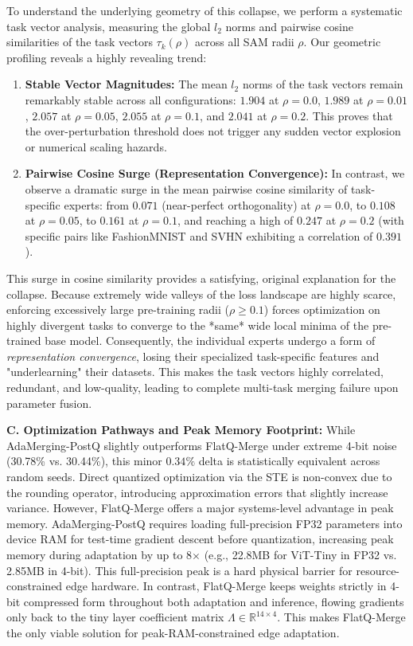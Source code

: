 To understand the underlying geometry of this collapse, we perform a systematic task vector analysis, measuring the global $l_2$ norms and pairwise cosine similarities of the task vectors $\tau_k(\rho)$ across all SAM radii $\rho$.
Our geometric profiling reveals a highly revealing trend:
\begin{enumerate}
    \item \textbf{Stable Vector Magnitudes:} The mean $l_2$ norms of the task vectors remain remarkably stable across all configurations: $1.904$ at $\rho=0.0$, $1.989$ at $\rho=0.01$, $2.057$ at $\rho=0.05$, $2.055$ at $\rho=0.1$, and $2.041$ at $\rho=0.2$. This proves that the over-perturbation threshold does not trigger any sudden vector explosion or numerical scaling hazards.
    \item \textbf{Pairwise Cosine Surge (Representation Convergence):} In contrast, we observe a dramatic surge in the mean pairwise cosine similarity of task-specific experts: from $0.071$ (near-perfect orthogonality) at $\rho=0.0$, to $0.108$ at $\rho=0.05$, to $0.161$ at $\rho=0.1$, and reaching a high of $0.247$ at $\rho=0.2$ (with specific pairs like FashionMNIST and SVHN exhibiting a correlation of $0.391$).
\end{enumerate}
This surge in cosine similarity provides a satisfying, original explanation for the collapse. Because extremely wide valleys of the loss landscape are highly scarce, enforcing excessively large pre-training radii ($\rho \ge 0.1$) forces optimization on highly divergent tasks to converge to the *same* wide local minima of the pre-trained base model. Consequently, the individual experts undergo a form of \emph{representation convergence}, losing their specialized task-specific features and "underlearning" their datasets. This makes the task vectors highly correlated, redundant, and low-quality, leading to complete multi-task merging failure upon parameter fusion.

\textbf{C. Optimization Pathways and Peak Memory Footprint:}
While AdaMerging-PostQ slightly outperforms FlatQ-Merge under extreme 4-bit noise (30.78\% vs. 30.44\%), this minor $0.34\%$ delta is statistically equivalent across random seeds. Direct quantized optimization via the STE is non-convex due to the rounding operator, introducing approximation errors that slightly increase variance.
However, FlatQ-Merge offers a major systems-level advantage in peak memory. AdaMerging-PostQ requires loading full-precision FP32 parameters into device RAM for test-time gradient descent before quantization, increasing peak memory during adaptation by up to 8$\times$ (e.g., 22.8MB for ViT-Tiny in FP32 vs. 2.85MB in 4-bit). This full-precision peak is a hard physical barrier for resource-constrained edge hardware. In contrast, FlatQ-Merge keeps weights strictly in 4-bit compressed form throughout both adaptation and inference, flowing gradients only back to the tiny layer coefficient matrix $\Lambda \in \mathbb{R}^{14 \times 4}$. This makes FlatQ-Merge the only viable solution for peak-RAM-constrained edge adaptation.

